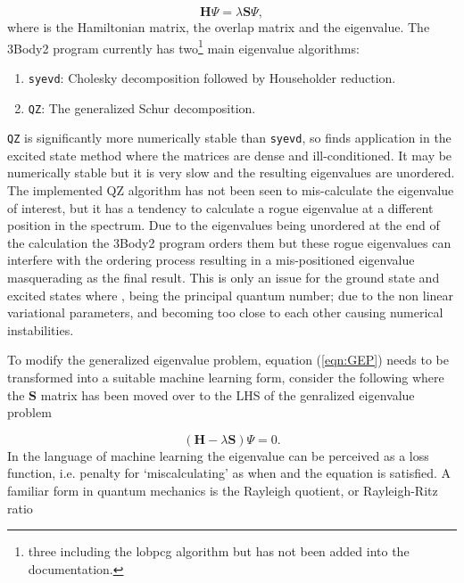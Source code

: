 \documentclass[12pt]{article}
\let\cite=\supercite
\begin{document}
\begin{equation}
  \mathbf{H}\Psi = \lambda \mathbf{S}\Psi,
  \label{eqn:GEP}
\end{equation}
where  is the Hamiltonian matrix,  the overlap matrix and \m{\lambda} the eigenvalue. The 3Body2 program currently has two\footnote{three including the lobpcg algorithm but has not been added into the documentation.} main eigenvalue algorithms:

\begin{enumerate}
  \item \texttt{syevd}: Cholesky decomposition followed by Householder reduction\cite{Anderson:1999vp}.
  \item \texttt{QZ}: The generalized Schur decomposition\cite{Kaufman:1977}.
\end{enumerate}
\texttt{QZ} is significantly more numerically stable than \texttt{syevd}\cite{BaskervilleThesis:2018}, so finds application in the excited state method where the matrices are dense and ill-conditioned. It may be numerically stable but it is very slow and the resulting eigenvalues are unordered. The implemented QZ algorithm has not been seen to mis-calculate the eigenvalue of interest, but it has a tendency to calculate a rogue eigenvalue at a different position in the spectrum. Due to the eigenvalues being unordered at the end of the calculation the 3Body2 program orders them but these rogue eigenvalues can interfere with the ordering process resulting in a mis-positioned eigenvalue masquerading as the final result. This is only an issue for the ground state and excited states where ,  being the principal quantum number; due to the non linear variational parameters,  and  becoming too close to each other causing numerical instabilities.

To modify the generalized eigenvalue problem, equation (\ref{eqn:GEP}) needs to be transformed into a suitable machine learning form, consider the following where the $\mathbf{S}$ matrix has been moved over to the LHS of the genralized eigenvalue problem

\begin{equation}
  (\mathbf{H} - \lambda \mathbf{S})\Psi = 0.
\end{equation}
In the language of machine learning the eigenvalue \m{\lambda} can be perceived as a loss function, i.e. penalty for `miscalculating'  as when  and  the equation is satisfied. A familiar form in quantum mechanics is the Rayleigh quotient, or Rayleigh-Ritz ratio
\end{document}
